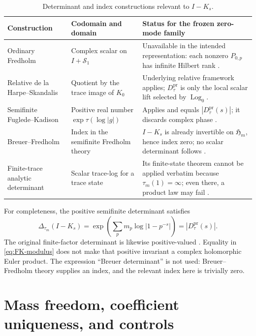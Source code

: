\documentclass[11pt,a4paper]{article}
\theoremstyle{definition}
\newcommand{\Log}{\operatorname{Log}}
\newcommand{\Dtau}{D^{\mathrm{pr}}_{\tau}}
\begin{document}
\begin{table}[htbp]
\centering
\caption{Determinant and index constructions relevant to $I-K_s$.}
\label{tab:taxonomy}
\small
\begin{tabularx}{\textwidth}{@{}p{}p{}X@{}}
\toprule
Construction & Codomain and domain & Status for the frozen zero-mode family \\
\midrule
Ordinary Fredholm & Complex scalar on $I+\mathcal S_1$ & Unavailable in the
intended representation: each nonzero $P_{0,p}$ has infinite Hilbert rank
\citep[Section 3]{Bornemann2010}. \\
Relative de la Harpe--Skandalis & Quotient by the trace image of $K_0$ &
Underlying relative framework applies; $\Dtau$ is only the local scalar lift
selected by $\Log_0$. \\
Semifinite Fuglede--Kadison & Positive real number
$\exp\tau(\log|g|)$ & Applies and equals $|\Dtau(s)|$; it discards complex
phase \citep[Definition 7.4]{HochsKaadSchemaitat2018}. \\
Breuer--Fredholm & Index in the semifinite Fredholm theory & $I-K_s$ is
already invertible on $\mathfrak H_m$, hence index zero; no scalar determinant
follows \citep[Section 3]{BenameurEtAl2006}. \\
Finite-trace analytic determinant & Scalar trace-log for a trace state & Its
finite-state theorem cannot be applied verbatim because $\tau_m(1)=\infty$;
even there, a product law may fail \citep[Remark 4.5]{GuidoIsolaLapidus2009}.
\\
\bottomrule
\end{tabularx}
\end{table}

For completeness, the positive semifinite determinant satisfies
\begin{equation}
 \Delta_{\tau_m}(I-K_s)
 =\exp\!\left(\sum_pm_p\log|1-p^{-s}|\right)
 =|\Dtau(s)|.
 \label{eq:FK-modulus}
\end{equation}
The original finite-factor determinant is likewise positive-valued
\citep[Definition and Lemma~1, p.~521]{FugledeKadison1952}.  Equality in
\eqref{eq:FK-modulus} does not make
that positive invariant a complex holomorphic Euler product.  The expression
``Breuer determinant'' is not used: Breuer--Fredholm theory supplies an index,
and the relevant index here is trivially zero.

\section{Mass freedom, coefficient uniqueness, and controls}
\label{sec:controls}
\end{document}
